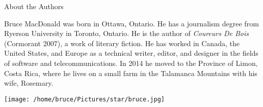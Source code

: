 \documentclass[letterpaper,9pt,twoside,titlepage,onecolumn,openany]{book}
\begin{document}
\tableofcontents





\newpage
\thispagestyle{empty}

\begin{center}

\Large{About the Authors}

\end{center}

\vspace{20mm}
\noindent
Bruce MacDonald was born in Ottawa, Ontario. He has a journalism degree from Ryerson University in Toronto, Ontario. He is the author of \textit{Coureurs De Bois} (Cormorant 2007), a work of literary fiction. He has worked in Canada, the United States, and Europe as a technical writer, editor, and designer in the fields of software and telecommunications. In 2014 he moved to the Province of Limon, Costa Rica, where he lives on a small farm in the Talamanca Mountains with his wife, Rosemary.

\begin{center}


\texttt{[image: /home/bruce/Pictures/star/bruce.jpg]}

\end{center}
\end{document}

